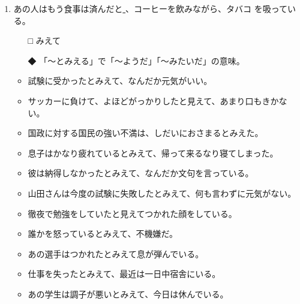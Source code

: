 \documentclass[
uplatex,
b5paper,
10pt,
dvipdfmx
]{jsbook}
\begin{document}
\begin{enumerate}
\item あの人はもう食事は済んだと\underline{   }、コーヒーを飲みながら、タバコ
      を吸っている。
\begin{itemize}
\item[□] みえて
\item[◆] 「〜とみえる」で「〜ようだ」「〜みたいだ」の意味。
\end{itemize}
\begin{itemize}
\item 試験に受かったとみえて、なんだか元気がいい。
\item サッカーに負けて、よほどがっかりしたと見えて、あまり口もきかない。
\item 国政に対する国民の強い不満は、しだいにおさまるとみえた。
\item 息子はかなり疲れているとみえて、帰って来るなり寝てしまった。
\item 彼は納得しなかったとみえて、なんだか文句を言っている。
\item 山田さんは今度の試験に失敗したとみえて、何も言わずに元気がない。
\item 徹夜で勉強をしていたと見えてつかれた顔をしている。
\item 誰かを怒っているとみえて、不機嫌だ。
\item あの選手はつかれたとみえて息が弾んでいる。
\item 仕事を失ったとみえて、最近は一日中宿舎にいる。
\item あの学生は調子が悪いとみえて、今日は休んでいる。
\end{itemize}



\end{enumerate}
\end{document}

